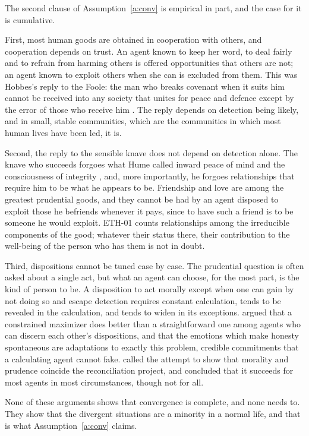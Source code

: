 \documentclass{situationist-preprint}
\begin{document}
The second clause of Assumption~\ref{a:conv} is empirical in part, and the case for it is cumulative.

First, most human goods are obtained in cooperation with others, and cooperation depends on trust. An agent known to keep her word, to deal fairly and to refrain from harming others is offered opportunities that others are not; an agent known to exploit others when she can is excluded from them. This was Hobbes's reply to the Foole: the man who breaks covenant when it suits him cannot be received into any society that unites for peace and defence except by the error of those who receive him \citep[ch.~15]{Hobbes1651}. The reply depends on detection being likely, and in small, stable communities, which are the communities in which most human lives have been led, it is.

Second, the reply to the sensible knave does not depend on detection alone. The knave who succeeds forgoes what Hume called inward peace of mind and the consciousness of integrity \citep[Conclusion, Part~II]{HumeEPM}, and, more importantly, he forgoes relationships that require him to be what he appears to be. Friendship and love are among the greatest prudential goods, and they cannot be had by an agent disposed to exploit those he befriends whenever it pays, since to have such a friend is to be someone he would exploit. ETH-01 counts relationships among the irreducible components of the good; whatever their status there, their contribution to the well-being of the person who has them is not in doubt.

Third, dispositions cannot be tuned case by case. The prudential question is often asked about a single act, but what an agent can choose, for the most part, is the kind of person to be. A disposition to act morally except when one can gain by not doing so and escape detection requires constant calculation, tends to be revealed in the calculation, and tends to widen in its exceptions. \citet{Gauthier1986} argued that a constrained maximizer does better than a straightforward one among agents who can discern each other's dispositions, and \citet{Frank1988} that the emotions which make honesty spontaneous are adaptations to exactly this problem, credible commitments that a calculating agent cannot fake. \citet{Kavka1984} called the attempt to show that morality and prudence coincide the reconciliation project, and concluded that it succeeds for most agents in most circumstances, though not for all.

None of these arguments shows that convergence is complete, and none needs to. They show that the divergent situations are a minority in a normal life, and that is what Assumption~\ref{a:conv} claims.
\end{document}
